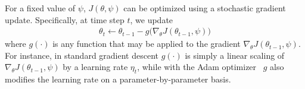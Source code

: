 For a fixed value of $\psi$, $J(\theta, \psi)$ can be optimized using a stochastic gradient update. Specifically, at time step $t$, we update
\begin{equation}
  \label{eqn:theta_update_rule}
  \begin{aligned}
    \theta_t \leftarrow \theta_{t-1} - g\big( \nabla_\theta J(\theta_{t-1}, \psi) \big)
  \end{aligned}
\end{equation}
where $g(\cdot)$ is any function that may be applied to the gradient $\nabla_\theta J(\theta_{t-1}, \psi)$. For instance, in standard gradient descent $g(\cdot)$ is simply a linear scaling of $\nabla_\theta J(\theta_{t-1}, \psi)$ by a learning rate $\eta_t$, while with the Adam optimizer~\citep{adam} $g$ also modifies the learning rate on a parameter-by-parameter basis.

